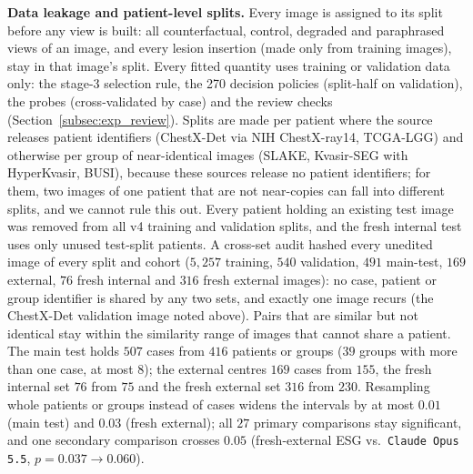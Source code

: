 \documentclass{article} %
\begin{document}
\textbf{Data leakage and patient-level splits.} Every image is assigned to its split before any view is built: all counterfactual, control, degraded and paraphrased views of an image, and every lesion insertion (made only from training images), stay in that image's split. Every fitted quantity uses training or validation data only: the stage-3 selection rule, the 270 decision policies (split-half on validation), the probes (cross-validated by case) and the review checks (Section~\ref{subsec:exp_review}). Splits are made per patient where the source releases patient identifiers (ChestX-Det via NIH ChestX-ray14, TCGA-LGG) and otherwise per group of near-identical images (SLAKE, Kvasir-SEG with HyperKvasir, BUSI), because these sources release no patient identifiers; for them, two images of one patient that are not near-copies can fall into different splits, and we cannot rule this out. Every patient holding an existing test image was removed from all v4 training and validation splits, and the fresh internal test uses only unused test-split patients. A cross-set audit hashed every unedited image of every split and cohort ($5{,}257$ training, $540$ validation, $491$ main-test, $169$ external, $76$ fresh internal and $316$ fresh external images): no case, patient or group identifier is shared by any two sets, and exactly one image recurs (the ChestX-Det validation image noted above). Pairs that are similar but not identical stay within the similarity range of images that cannot share a patient. The main test holds $507$ cases from $416$ patients or groups ($39$ groups with more than one case, at most $8$); the external centres $169$ cases from $155$, the fresh internal set $76$ from $75$ and the fresh external set $316$ from $230$. Resampling whole patients or groups instead of cases widens the intervals by at most $0.01$ (main test) and $0.03$ (fresh external); all $27$ primary comparisons stay significant, and one secondary comparison crosses $0.05$ (fresh-external ESG vs.\ \texttt{Claude Opus 5.5}, $p = 0.037 \to 0.060$).
\end{document}
